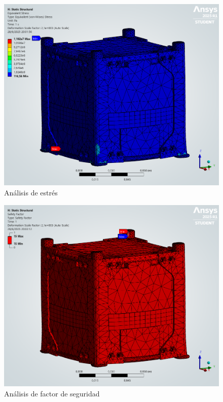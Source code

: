   \begin{figure}[H]
    \centering
    \includegraphics[width=14cm]{image/fem/ansys_cubesat-static_stress.png}
    \caption{Análisis de estrés}
  \end{figure}

  \begin{figure}[H]
    \centering
    \includegraphics[width=14cm]{image/fem/ansys_cubesat-static_safety.png}
    \caption{Análisis de factor de seguridad}
  \end{figure}

